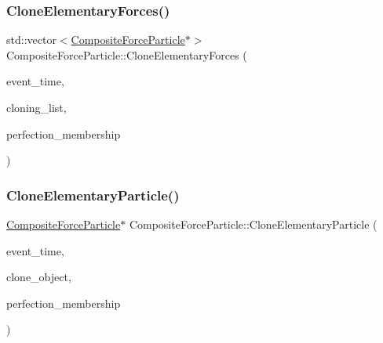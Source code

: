 \subsubsection{\texorpdfstring{Clone\+Elementary\+Forces()}{CloneElementaryForces()}}
{\footnotesize\ttfamily std\+::vector$<$\mbox{\hyperlink{classCompositeForceParticle}{Composite\+Force\+Particle}}$\ast$$>$ Composite\+Force\+Particle\+::\+Clone\+Elementary\+Forces (\begin{DoxyParamCaption}\item[{std\+::chrono\+::time\+\_\+point$<$ \mbox{\hyperlink{universe_8h_a0ef8d951d1ca5ab3cfaf7ab4c7a6fd80}{Clock}} $>$}]{event\+\_\+time,  }\item[{std\+::vector$<$ \mbox{\hyperlink{classCompositeForceParticle}{Composite\+Force\+Particle}} $\ast$$>$}]{cloning\+\_\+list,  }\item[{double}]{perfection\+\_\+membership }\end{DoxyParamCaption})}

\mbox{\label{classCompositeForceParticle_a559031016355b79ee795e621fdbbdb13}} 
\subsubsection{\texorpdfstring{Clone\+Elementary\+Particle()}{CloneElementaryParticle()}}
{\footnotesize\ttfamily \mbox{\hyperlink{classCompositeForceParticle}{Composite\+Force\+Particle}}$\ast$ Composite\+Force\+Particle\+::\+Clone\+Elementary\+Particle (\begin{DoxyParamCaption}\item[{std\+::chrono\+::time\+\_\+point$<$ \mbox{\hyperlink{universe_8h_a0ef8d951d1ca5ab3cfaf7ab4c7a6fd80}{Clock}} $>$}]{event\+\_\+time,  }\item[{\mbox{\hyperlink{classCompositeForceParticle}{Composite\+Force\+Particle}} $\ast$}]{clone\+\_\+object,  }\item[{double}]{perfection\+\_\+membership }\end{DoxyParamCaption})}

\mbox{\label{classCompositeForceParticle_ac27e6d3bb56272728a8c197dbcd2db4e}} 
